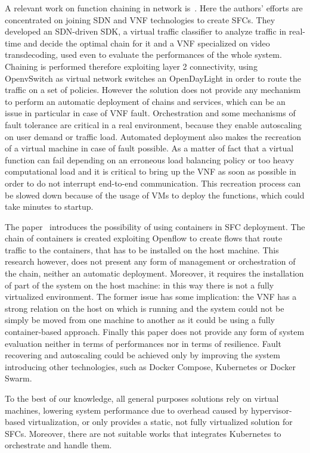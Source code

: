 A relevant work on function chaining in network is~\cite{trajkovska2017sdn}.
Here the authors' efforts are concentrated on joining SDN and VNF technologies
to create SFCs. They developed an SDN-driven SDK, a virtual traffic classifier
to analyze traffic in real-time and decide the optimal chain for it and a VNF
specialized on video transdecoding, used even to evaluate the performances of
the whole system. Chaining is performed therefore exploiting layer 2
connectivity, using OpenvSwitch as virtual network switches an OpenDayLight in
order to route the
traffic on a set of policies. However the solution does not provide any
mechanism to perform an automatic deployment of chains and services, which can
be an issue in particular in case of VNF fault. Orchestration and some
mechanisms of fault tolerance are critical in a real environment, because they
enable autoscaling on user demand or traffic load. Automated deployment also
makes the recreation of a virtual machine in case of fault possible. As a matter
of fact that a virtual function can fail depending on an erroneous load
balancing policy or too heavy computational load and it is critical to bring up
the VNF as soon as possible in order to do not interrupt end-to-end
communication. This recreation process can be slowed down because of the usage
of VMs to deploy the functions, which could take minutes to startup.

The paper~\cite{kriti2017dnfc} introduces the possibility of using containers in
SFC deployment. The chain of containers is created exploiting Openflow to create
flows that route traffic to the containers, that has to be installed on the host
machine. This research however, does not present any form of management or
orchestration of the chain, neither an automatic deployment. Moreover, it
requires the installation of part of the system on the host machine: in this way
there is not a fully virtualized environment. The former issue has some
implication: the VNF has a strong relation on the host on which is running and
the system could not be simply be moved from one machine to another as it could
be using a fully container-based approach. Finally this paper does not provide
any form of system evaluation neither in terms of performances nor in terms of
resilience. Fault recovering and autoscaling could be achieved only by improving
the system introducing other technologies, such as Docker Compose, Kubernetes or
Docker Swarm.

To the best of our knowledge, all general purposes solutions rely on virtual
machines, lowering system performance due to overhead caused by hypervisor-based
virtualization, or only provides a static, not fully virtualized solution for
SFCs. Moreover, there are not suitable works that integrates Kubernetes to
orchestrate and handle them.

